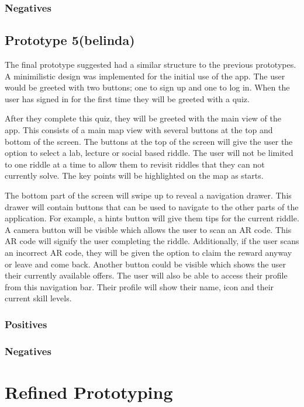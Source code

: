 \documentclass[a4,10pt,twocolumn]{article}
\begin{document}
\subsubsection*{Negatives}

\subsection*{Prototype 5(belinda)}
The final prototype suggested had a similar structure to the previous prototypes. A minimilistic design was implemented for the initial use of the app. The user would be greeted with two buttons; one to sign up and one to log in. When the user has signed in for the first time they will be greeted with a quiz.

After they complete this quiz, they will be greeted with the main view of the app. This consists of a main map view with several buttons at the top and bottom of the screen. The buttons at the top of the screen will give the user the option to select a lab, lecture or social based riddle. The user will not be limited to one riddle at a time to allow them to revisit riddles that they can not currently solve. The key points will be highlighted on the map as starts.

The bottom part of the screen will swipe up to reveal a navigation drawer. This drawer will contain buttons that can be used to navigate to the other parts of the application. For example, a hints button will give them tips for the current riddle. A camera button will be visible which allows the user to scan an AR code. This AR code will signify the user completing the riddle. Additionally, if the user scans an incorrect AR code, they will be given the option to claim the reward anyway or leave and come back. Another button could be visible which shows the user their currently available offers. The user will also be able to access their profile from this navigation bar. Their profile will show their name, icon and their current skill levels.
\subsubsection*{Positives}
\subsubsection*{Negatives}
\section*{Refined Prototyping}
\end{document}
